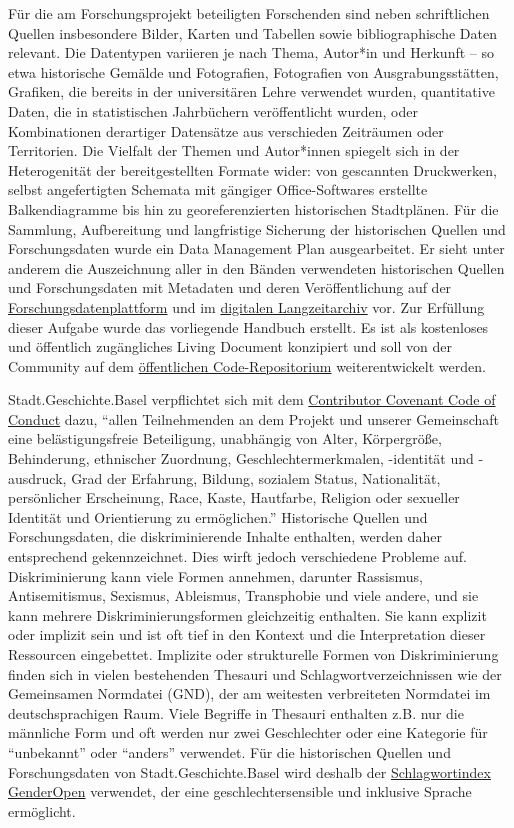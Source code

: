 \documentclass[
  nswissgerman,
  letterpaper,
  DIV=11,
  numbers=noendperiod]{scrartcl}
\begin{document}
Für die am Forschungsprojekt beteiligten Forschenden sind neben
schriftlichen Quellen insbesondere Bilder, Karten und Tabellen sowie
bibliographische Daten relevant. Die Datentypen variieren je nach Thema,
Autor*in und Herkunft -- so etwa historische Gemälde und Fotografien,
Fotografien von Ausgrabungsstätten, Grafiken, die bereits in der
universitären Lehre verwendet wurden, quantitative Daten, die in
statistischen Jahrbüchern veröffentlicht wurden, oder Kombinationen
derartiger Datensätze aus verschieden Zeiträumen oder Territorien. Die
Vielfalt der Themen und Autor*innen spiegelt sich in der Heterogenität
der bereitgestellten Formate wider: von gescannten Druckwerken, selbst
angefertigten Schemata mit gängiger Office-Softwares erstellte
Balkendiagramme bis hin zu georeferenzierten historischen Stadtplänen.
Für die Sammlung, Aufbereitung und langfristige Sicherung der
historischen Quellen und Forschungsdaten wurde ein Data Management Plan
ausgearbeitet. Er sieht unter anderem die Auszeichnung aller in den
Bänden verwendeten historischen Quellen und Forschungsdaten mit
Metadaten und deren Veröffentlichung auf der
\href{https://forschung.stadtgeschichtebasel.ch/}{Forschungsdatenplattform}
und im
\href{https://zenodo.org/communities/stadt-geschichte-basel/}{digitalen
Langzeitarchiv} vor. Zur Erfüllung dieser Aufgabe wurde das vorliegende
Handbuch erstellt. Es ist als kostenloses und öffentlich zugängliches
Living Document konzipiert und soll von der Community auf dem
\href{https://github.com/maehr/diskriminierungsfreie-metadaten}{öffentlichen
Code-Repositorium} weiterentwickelt werden.

Stadt.Geschichte.Basel verpflichtet sich mit dem
\href{https://www.contributor-covenant.org/version/2/1/code_of_conduct/}{Contributor
Covenant Code of Conduct} dazu, ``allen Teilnehmenden an dem Projekt und
unserer Gemeinschaft eine belästigungsfreie Beteiligung, unabhängig von
Alter, Körpergröße, Behinderung, ethnischer Zuordnung,
Geschlechtermerkmalen, -identität und -ausdruck, Grad der Erfahrung,
Bildung, sozialem Status, Nationalität, persönlicher Erscheinung, Race,
Kaste, Hautfarbe, Religion oder sexueller Identität und Orientierung zu
ermöglichen.'' Historische Quellen und Forschungsdaten, die
diskriminierende Inhalte enthalten, werden daher entsprechend
gekennzeichnet. Dies wirft jedoch verschiedene Probleme auf.
Diskriminierung kann viele Formen annehmen, darunter Rassismus,
Antisemitismus, Sexismus, Ableismus, Transphobie und viele andere, und
sie kann mehrere Diskriminierungsformen gleichzeitig enthalten. Sie kann
explizit oder implizit sein und ist oft tief in den Kontext und die
Interpretation dieser Ressourcen eingebettet. Implizite oder
strukturelle Formen von Diskriminierung finden sich in vielen
bestehenden Thesauri und Schlagwortverzeichnissen wie der Gemeinsamen
Normdatei (GND), der am weitesten verbreiteten Normdatei im
deutschsprachigen Raum. Viele Begriffe in Thesauri enthalten z.B. nur
die männliche Form und oft werden nur zwei Geschlechter oder eine
Kategorie für ``unbekannt'' oder ``anders'' verwendet. Für die
historischen Quellen und Forschungsdaten von Stadt.Geschichte.Basel wird
deshalb der
\href{https://opengenderplatform.de/schlagwortindex}{Schlagwortindex
GenderOpen} verwendet, der eine geschlechtersensible und inklusive
Sprache ermöglicht.
\end{document}
